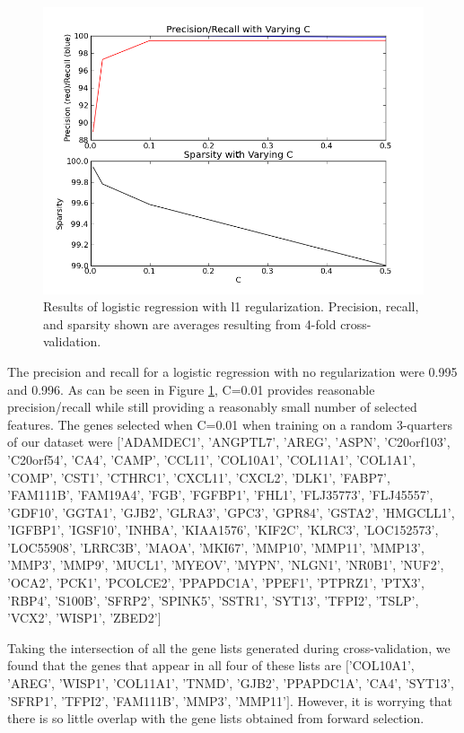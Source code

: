 \documentclass[11pt]{article}
\begin{document}
\begin{figure}[h!]
  \centering
    \includegraphics[scale=0.3]{sparselog.png}
  \caption{Results of logistic regression with l1 regularization. Precision, recall, and sparsity shown are averages resulting from 4-fold cross-validation.}
\label{fig:sparselog}
\end{figure}

The precision and recall for a logistic regression with no regularization were 0.995 and 0.996. As can be seen in Figure \ref{fig:sparselog}, C=0.01 provides reasonable precision/recall while still providing a reasonably small number of selected features. The genes selected when C=0.01 when training on a random 3-quarters of our dataset were $[$'ADAMDEC1', 'ANGPTL7', 'AREG', 'ASPN', 'C20orf103', 'C20orf54', 'CA4', 'CAMP', 'CCL11', 'COL10A1', 'COL11A1', 'COL1A1', 'COMP', 'CST1', 'CTHRC1', 'CXCL11', 'CXCL2', 'DLK1', 'FABP7', 'FAM111B', 'FAM19A4', 'FGB', 'FGFBP1', 'FHL1', 'FLJ35773', 'FLJ45557', 'GDF10', 'GGTA1', 'GJB2', 'GLRA3', 'GPC3', 'GPR84', 'GSTA2', 'HMGCLL1', 'IGFBP1', 'IGSF10', 'INHBA', 'KIAA1576', 'KIF2C', 'KLRC3', 'LOC152573', 'LOC55908', 'LRRC3B', 'MAOA', 'MKI67', 'MMP10', 'MMP11', 'MMP13', 'MMP3', 'MMP9', 'MUCL1', 'MYEOV', 'MYPN', 'NLGN1', 'NR0B1', 'NUF2', 'OCA2', 'PCK1', 'PCOLCE2', 'PPAPDC1A', 'PPEF1', 'PTPRZ1', 'PTX3', 'RBP4', 'S100B', 'SFRP2', 'SPINK5', 'SSTR1', 'SYT13', 'TFPI2', 'TSLP', 'VCX2', 'WISP1', 'ZBED2'$]$

Taking the intersection of all the gene lists generated during cross-validation, we found that the genes that appear in all four of these lists are $[$'COL10A1', 'AREG', 'WISP1', 'COL11A1', 'TNMD', 'GJB2', 'PPAPDC1A', 'CA4', 'SYT13', 'SFRP1', 'TFPI2', 'FAM111B', 'MMP3', 'MMP11'$]$. However, it is worrying that there is so little overlap with the gene lists obtained from forward selection.
\end{document}
